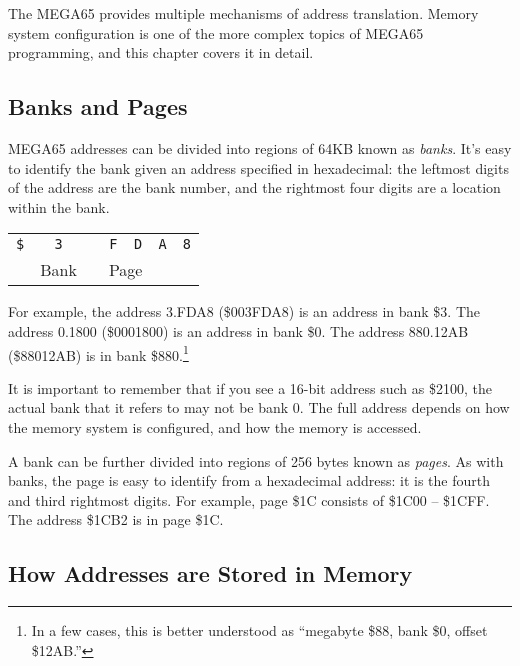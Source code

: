 The MEGA65 provides multiple mechanisms of address translation. Memory system configuration is one of the more complex topics of MEGA65 programming, and this chapter covers it in detail.

\subsection{Banks and Pages}

MEGA65 addresses can be divided into regions of 64KB known as {\em banks}. It's easy to identify the bank given an address specified in hexadecimal: the leftmost digits of the address are the bank number, and the rightmost four digits are a location within the bank.

\medskip
\begin{center}
\begin{tabular}{m{0.4cm}m{0.4cm}m{0.05cm}m{0.4cm}m{0.4cm}m{0.4cm}m{0.4cm}}
\multicolumn{1}{c}{\huge\texttt{\$}} &
\multicolumn{1}{c}{\huge\texttt{3}} &
\multicolumn{1}{c}{ } &
\multicolumn{1}{c}{\huge\texttt{F}} &
\multicolumn{1}{c}{\huge\texttt{D}} &
\multicolumn{1}{c}{\huge\texttt{A}} &
\multicolumn{1}{c}{\huge\texttt{8}} \\
\cline{2-2}\cline{4-5}
& \multicolumn{1}{c}{\small Bank} & & \multicolumn{2}{c}{\small Page} &
\multicolumn{2}{c}{ } \\
\end{tabular}
\end{center}
\medskip

For example, the address 3.FDA8 (\$003FDA8) is an address in bank \$3. The address 0.1800 (\$0001800) is an address in bank \$0. The address 880.12AB (\$88012AB) is in bank \$880.\footnote{In a few cases, this is better understood as ``megabyte \$88, bank \$0, offset \$12AB.''}

It is important to remember that if you see a 16-bit address such as \$2100, the actual bank that it refers to may not be bank 0. The full address depends on how the memory system is configured, and how the memory is accessed.

A bank can be further divided into regions of 256 bytes known as {\em pages}. As with banks, the page is easy to identify from a hexadecimal address: it is the fourth and third rightmost digits. For example, page \$1C consists of \$1C00 -- \$1CFF. The address \$1CB2 is in page \$1C.

\subsection{How Addresses are Stored in Memory}

